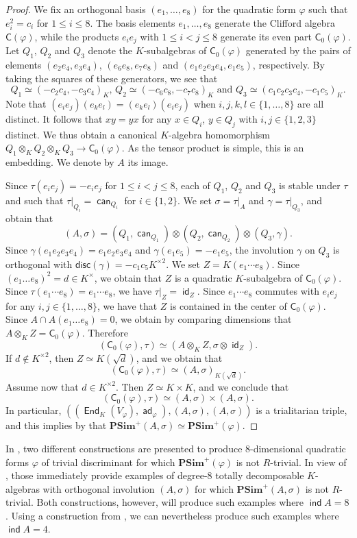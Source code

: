 \documentclass[twoside,11pt]{amsart}
\numberwithin{equation}{section}
\theoremstyle{definition}
\newcommand\ind{\operatorname{\mathsf{ind}}}
\newcommand\End{\operatorname{\mathsf{End}}}
\newcommand\id{\operatorname{\mathsf{id}}}
\newcommand{\can}{\operatorname{\mathsf{can}}}
\newcommand{\vf}{\varphi}
\newcommand{\mg}[1]{{#1}^{\times}}
\newcommand{\sq}[1]{{#1}^{\times 2}}
\newcommand{\s}{\sigma}
\renewcommand{\leq}{\leqslant}
\newcommand\ad{\operatorname{\mathsf{ad}}}
\newcommand{\disc}{\mathsf{disc}}
\newcommand{\C}{\mathsf{C}}
\begin{document}
\begin{proof}
We fix an orthogonal basis $(e_1,\ldots,e_8)$ for the quadratic form $\vf$ such that $e_i^2=c_i$ for $1\leq i\leq 8$.
The basis elements $e_1,\dots,e_8$ generate the Clifford algebra $\C(\vf)$, while the products $e_ie_j$ with $1\leq i<j\leq 8$ generate its even part $\C_0(\vf)$.
Let $Q_1$, $Q_2$ and $Q_3$ denote the $K$-subalgebras of $\C_0(\vf)$ generated by the pairs of elements $(e_2e_4,e_3e_4)$, $(e_6e_8,e_7e_8)$ and $(e_1e_2e_3e_4,e_1e_5)$, respectively.
By taking the squares of these generators, we see that 
\[Q_1\simeq (-c_2c_4,-c_3c_4)_K,\, Q_2\simeq (-c_6c_8,-c_7c_8)_K\text{ and }Q_3\simeq (c_1c_2c_3c_4,-c_1c_5)_K.\]
Note that $(e_ie_j)(e_ke_l)=(e_ke_l)(e_ie_j)$ when $i,j,k,l\in\{1,\dots,8\}$ are all distinct.
It follows that $xy=yx$ for any $x\in Q_i$, $y\in Q_j$ with $i,j\in\{1,2,3\}$ distinct.
We thus obtain a canonical $K$-algebra homomorphism $Q_1\otimes_K Q_2\otimes_K Q_3\to \C_0(\vf)$.
As the tensor product is simple, this is an embedding.
We denote by $A$ its image.

Since $\tau(e_ie_j)=-e_ie_j$ for $1\leq i<j\leq 8$, each of $Q_1$, $Q_2$ and $Q_3$ is stable under $\tau$ and such that $
\tau|_{Q_i}=\can_{Q_i}$ for $i\in\{1,2\}$.
We set $\s=\tau|_A$ and $\gamma=\tau|_{Q_3}$, and obtain that
\[(A,\s)= (Q_1,\can_{Q_1})\otimes (Q_2,\can_{Q_2})\otimes (Q_3,\gamma).\]
Since $\gamma(e_1e_2e_3e_4)=e_1e_2e_3e_4$ and $\gamma(e_1e_5)=-e_1e_5$, the involution $\gamma$ on $Q_3$ is orthogonal with  $\disc(\gamma)=-c_1c_5\sq{K}$.
We set $Z=K(e_1\cdots e_8)$.
Since $(e_1\dots e_8)^2=d\in\mg{K}$, we 
obtain that $Z$ is a quadratic $K$-subalgebra of $\C_0(\vf)$.
Since $\tau(e_1\cdots e_8)=e_1\cdots e_8$, we have  
$\tau|_Z=\id_Z$.
Since $e_1\cdots e_8$ commutes with $e_ie_j$ for any $i,j\in\{1,\dots,8\}$, we have that $Z$ is contained in the center of $\C_0(\vf)$.
Since $A\cap A(e_1\dots e_8)=0$, we obtain by comparing dimensions that $A\otimes_KZ=\C_0(\vf)$.
Therefore 
 \[(\C_0(\vf),\tau)\simeq (A\otimes_K Z,\s\otimes\id_Z).\]
If $d\notin\sq{K}$, then $Z\simeq K(\sqrt{d})$, and we obtain that 
\[(\C_0(\vf),\tau)\simeq (A,\s)_{K(\sqrt{d})}.\]
Assume now that $d\in\sq{K}$.
Then $Z\simeq K\times K$, 
and we conclude that 
\[(\C_0(\vf),\tau)\simeq (A,\s)\times (A,\s).\]
In particular, $\left((\End_K(V_\vf),\ad_\vf),(A,\s),(A,\s)\right)$ is a trialitarian triple, and this implies by \cite[Prop.~42.5]{KMRT98} that 
$\mathbf{PSim}^+(A,\s)\simeq \mathbf{PSim}^+(\vf)$.
\end{proof}

In \cite[Theorems 2 \& 3]{Gil97}, two different constructions are presented to produce $8$-dimensional quadratic forms $\vf$ of trivial discriminant for which $\mathbf{PSim}^+(\vf)$ is not $R$-trivial.
In view of , those immediately provide examples of degree-$8$ totally decomposable $K$-algebras with orthogonal involution $(A,\s)$ for which 
$\mathbf{PSim}^+(A,\s)$ is not $R$-trivial.
Both constructions, however, will produce such examples where $\ind A=8$.
Using a construction from \cite[Theorem~7.5]{AB25}, we can nevertheless produce such examples where $\ind A=4$.
\end{document}
